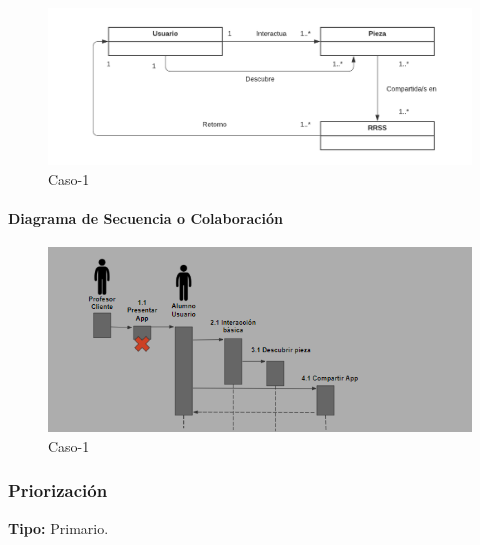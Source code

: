 \begin{figure}[H]
\centerline{\includegraphics[width=15cm]{imgs/ModeloConceptualCaso_1_3.png}}
\caption{Caso-1}
\label{fig}
\end{figure}

\paragraph{Diagrama de Secuencia o Colaboración}

\begin{figure}[H]
\centerline{\includegraphics[width=15cm]{imgs/CasoUso_1_2.PNG}}
\caption{Caso-1}
\label{fig}
\end{figure}

\subsubsection{Priorización}
{\textbf {Tipo:}}
Primario.